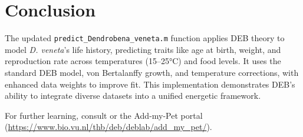 \documentclass[11pt]{article}
\begin{document}
\section{Conclusion}
The updated \texttt{predict\_Dendrobena\_veneta.m} function applies DEB theory to model \textit{D. veneta}’s life history, predicting traits like age at birth, weight, and reproduction rate across temperatures (15–25°C) and food levels. It uses the standard DEB model, von Bertalanffy growth, and temperature corrections, with enhanced data weights to improve fit. This implementation demonstrates DEB’s ability to integrate diverse datasets into a unified energetic framework.

For further learning, consult \citet{Kooijman2010} or the Add-my-Pet portal (\url{https://www.bio.vu.nl/thb/deb/deblab/add_my_pet/}).



\end{document}
